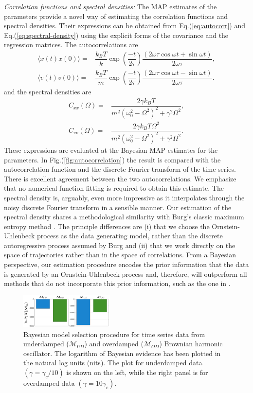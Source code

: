 \documentclass[english,aps, twocolumn, pre,superscriptaddress, notitlepage]{revtex4-1}
\begin{document}
\emph{Correlation functions and spectral densities: }The MAP estimates
of the parameters provide a novel way of estimating the correlation
functions and spectral densities. Their expressions can be obtained
from Eq.(\ref{eq:autocorr}) and Eq.(\ref{eq:spectral-density}) using
the explicit forms of the covariance and the regression matrices.
The autocorrelations are 
\begin{align*}
\langle x\left(t\right)x\left(0\right)\rangle= & \dfrac{k_{B}T}{k}\exp\left(\dfrac{-t}{2\tau}\right)\dfrac{(2\omega\tau\cos\omega t+\sin\omega t)}{2\omega\tau},\\
\langle v\left(t\right)v\left(0\right)\rangle= & \dfrac{k_{B}T}{m}\exp\left(\dfrac{-t}{2\tau}\right)\dfrac{(2\omega\tau\cos\omega t-\sin\omega t)}{2\omega\tau}.
\end{align*}
and the spectral densities are
\begin{align*}
C_{xx}(\Omega)= & \dfrac{2\gamma k_{B}T}{m^{2}(\omega_{0}^{2}-\Omega^{2})^{2}+\gamma^{2}\Omega^{2}},\\
C_{vv}(\Omega)= & \dfrac{2\gamma k_{B}T\Omega^{2}}{m^{2}(\omega_{0}^{2}-\Omega^{2})^{2}+\gamma^{2}\Omega^{2}}.
\end{align*}
These expressions are evaluated at the Bayesian MAP estimates for
the parameters. In Fig.(\ref{fig:autocorrelation}) the result is
compared with the autocorrelation function and the discrete Fourier
transform of the time series. There is excellent agreement between
the two autocorrelations. We emphasize that no numerical function
fitting is required to obtain this estimate. The spectral density
is, arguably, even more impressive as it interpolates through the
noisy discrete Fourier transform in a sensible manner. Our estimation
of the spectral density shares a methodological similarity with Burg's
classic maximum entropy method \cite{burg1967maximum}. The principle
differences are (i) that we choose the Ornstein-Uhlenbeck process
as the data generating model, rather than the discrete autoregressive
process assumed by Burg and (ii) that we work directly on the space
of trajectories rather than in the space of correlations. From a Bayesian
perspective, our estimation procedure encodes the prior information
that the data is generated by an Ornstein-Uhlenbeck process and, therefore,
will outperform all methods \cite{berg2004power,tassieri2012microrheology}
that do not incorporate this prior information, such as the one in
\cite{Bera:16}.
\begin{figure}[t]
\includegraphics[width=0.42\textwidth]{Fig4.png}
\caption{Bayesian model selection procedure for time series data from underdamped
($\mathcal{M}_{UD}$) and overdamped ($\mathcal{M}_{OD}$) Brownian
harmonic oscillator. The logarithm of Bayesian evidence has been plotted
in the natural log units (nits). The plot for underdamped data $(\gamma=\gamma_{c}/10)$
is shown on the left, while the right panel is for overdamped data
$(\gamma=10\gamma_{c})$.\label{fig:modelSelection} }
\end{figure}
\end{document}
